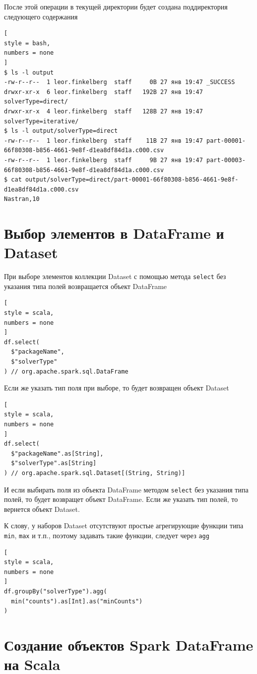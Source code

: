 \documentclass[%
	11pt,
	a4paper,
	utf8,
		]{article}
\begin{document}
После этой операции в текущей директории будет создана поддиректория  следующего содержания
\begin{lstlisting}[
style = bash,
numbers = none	
]
$ ls -l output
-rw-r--r--  1 leor.finkelberg  staff     0B 27 янв 19:47 _SUCCESS
drwxr-xr-x  6 leor.finkelberg  staff   192B 27 янв 19:47 solverType=direct/
drwxr-xr-x  4 leor.finkelberg  staff   128B 27 янв 19:47 solverType=iterative/
$ ls -l output/solverType=direct
-rw-r--r--  1 leor.finkelberg  staff    11B 27 янв 19:47 part-00001-66f80308-b856-4661-9e8f-d1ea8df84d1a.c000.csv
-rw-r--r--  1 leor.finkelberg  staff     9B 27 янв 19:47 part-00003-66f80308-b856-4661-9e8f-d1ea8df84d1a.c000.csv
$ cat output/solverType=direct/part-00001-66f80308-b856-4661-9e8f-d1ea8df84d1a.c000.csv
Nastran,10
\end{lstlisting}

\section{Выбор элементов в DataFrame и Dataset}

При выборе элементов коллекции Dataset с помощью метода \texttt{select} без указания типа полей возвращается объект DataFrame
\begin{lstlisting}[
style = scala,
numbers = none	
]
df.select(
  $"packageName",
  $"solverType"
) // org.apache.spark.sql.DataFrame
\end{lstlisting}

Если же указать тип поля при выборе, то будет возвращен объект Dataset
\begin{lstlisting}[
style = scala,
numbers = none	
]
df.select(
  $"packageName".as[String],
  $"solverType".as[String]
) // org.apache.spark.sql.Dataset[(String, String)]
\end{lstlisting}

И если выбирать поля из объекта DataFrame методом \texttt{select} без указания типа полей, то будет возвращет объект DataFrame. Если же указать тип полей, то вернется объект Dataset.

К слову, у наборов Dataset отсутствуют простые агрегирующие функции типа \texttt{min}, \texttt{max} и т.п., поэтому задавать такие функции, следует через \texttt{agg}
\begin{lstlisting}[
style = scala,
numbers = none	
]
df.groupBy("solverType").agg(
  min("counts").as[Int].as("minCounts")
)
\end{lstlisting}


\section{Создание объектов Spark DataFrame на Scala}
\end{document}

